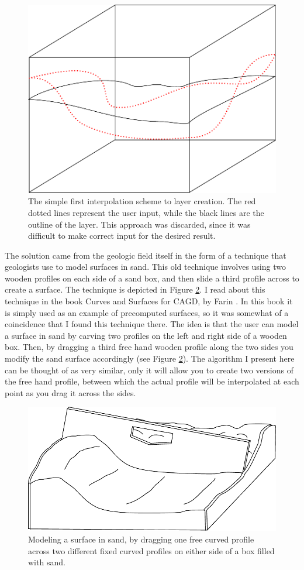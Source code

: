 \documentclass[a4paper,12pt]{report}
\begin{document}
\begin{figure}
 \centering
\includegraphics[width=.4\linewidth]{thesis/layerSimpleInterpol.pdf}
 \caption{The simple first interpolation scheme to layer creation. The red dotted lines represent the user input, while the black lines are the outline of the layer. This approach was discarded, since it was difficult to make correct input for the desired result.}
 \label{fig:layerSimpleInterpol}
\end{figure}

The solution came from the geologic field itself in the form of a technique that geologists use to model surfaces in sand. This old technique involves using two wooden profiles on each side of a sand box, and then slide a third profile across to create a surface. The technique is depicted in Figure \ref{fig:wooden}. I read about this technique in the book Curves and Surfaces for CAGD, by Farin \cite{farin2001curves}. In this book it is simply used as an example of precomputed surfaces, so it was somewhat of a coincidence that I found this technique there. The idea is that the user can model a surface in sand by carving two profiles on the left and right side of a wooden box. Then, by dragging a third free hand wooden profile along the two sides you modify the sand surface accordingly (see Figure \ref{fig:wooden}). The algorithm I present here can be thought of as very similar, only it will allow you to create two versions of the free hand profile, between which the actual profile will be interpolated at each point 
as you drag it across the sides.

\begin{figure}
\centering
 \includegraphics[width=0.8\linewidth]{thesis/sandbox.pdf}
 \caption{Modeling a surface in sand, by dragging one free curved profile across two different fixed curved profiles on either side of a box filled with sand.}
 \label{fig:wooden}
\end{figure}
\end{document}
